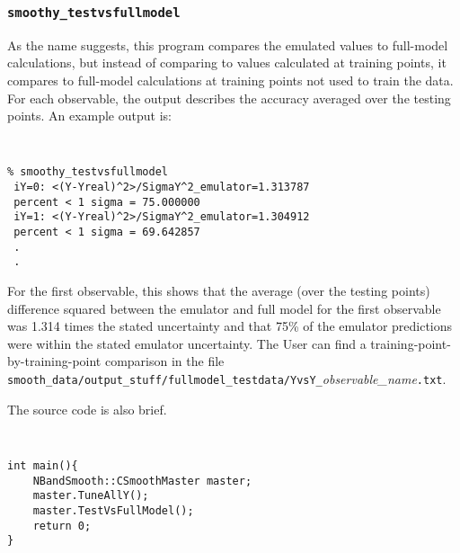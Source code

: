 \documentclass[UserManual.tex]{subfiles}
\begin{document}
\subsubsection{{\tt smoothy\_testvsfullmodel}}
As the name suggests, this program compares the emulated values to full-model calculations, but instead of comparing to values calculated at training points, it compares to full-model calculations at training points not used to train the data.
For each observable, the output describes the accuracy averaged over the testing points. An example output is:
{\tt
\begin{verbatim}
% smoothy_testvsfullmodel 
 iY=0: <(Y-Yreal)^2>/SigmaY^2_emulator=1.313787
 percent < 1 sigma = 75.000000
 iY=1: <(Y-Yreal)^2>/SigmaY^2_emulator=1.304912
 percent < 1 sigma = 69.642857
 .
 .
\end{verbatim}}
For the first observable, this shows that the average (over the testing points) difference squared between the emulator and full model for the first observable was 1.314 times the stated uncertainty and that 75\% of the emulator predictions were within the stated emulator uncertainty. The User can find a training-point-by-training-point comparison in the file {\tt smooth\_data/output\_stuff/fullmodel\_testdata/YvsY\_}{\it observable\_name}{\tt.txt}.

The source code is also brief.
{\tt
\begin{verbatim}
int main(){
	NBandSmooth::CSmoothMaster master;
	master.TuneAllY();
	master.TestVsFullModel();
	return 0;
}
\end{verbatim}}
\end{document}
